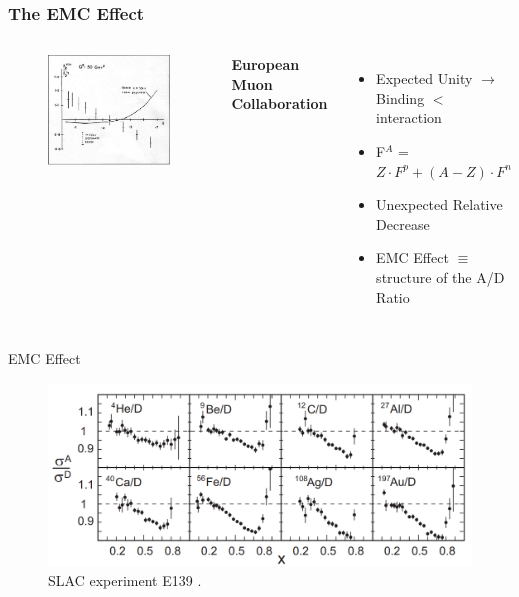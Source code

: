 \documentclass[12pt]{beamer}
\begin{document}
\begin{frame}
\frametitle{The EMC Effect}
\begin{columns}[t]
	\vspace{-35pt}
	\begin{figure}
		\includegraphics[width =7cm]{../images/Thesis/EMC.png}
		\caption*{\cite{cc}}
	\end{figure}
	\centering
	\textbf{ European Muon Collaboration}
	\begin{itemize}
		\item Expected Unity $\rightarrow$ Binding $<$ interaction
		\item F$^A$ = $Z \cdot F^p + (A-Z)\cdot F^n$  
		\item Unexpected Relative Decrease
		\item EMC Effect $\equiv$ structure of the A/D Ratio
	\end{itemize}
	
\end{columns}
\end{frame}



\begin{frame}{EMC Effect}

\begin{figure}
\caption*{\label{EMC_slac} SLAC experiment E139 \cite{slac_emc} .}
\includegraphics[width =12cm]{../images/EMC_slac_horiz.png}
\end{figure}


\end{frame}
\end{document}
